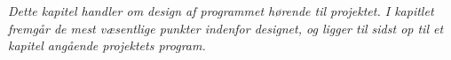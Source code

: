 \textit{Dette kapitel handler om design af programmet hørende til projektet. I kapitlet fremgår de mest væsentlige punkter indenfor designet, og ligger til sidst op til et kapitel angående projektets program.}